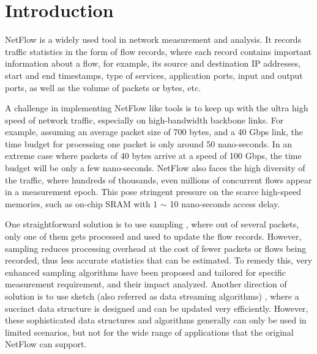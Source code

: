 \section{Introduction}
\label{section:introduction}
NetFlow\cite{claise_cisco_2004} is a widely used tool in network measurement and analysis.
It records traffic statistics in the form of flow records, where each record contains important 
information about a flow, for example, its source and destination IP addresses, 
start and end timestamps,  type of services, application ports, input and output ports, 
as well as the volume of packets or bytes, etc. 

A challenge in implementing NetFlow like tools is to keep up with the ultra high speed 
of network traffic, especially on high-bandwidth backbone links. For example, assuming an 
average packet size of 700 bytes, and a 40 Gbps link, the time budget for processing 
one packet is only around 50 nano-seconds\cite{zhang_more_2017}\cite{zhang_more_2015}\cite{wang_efficient_2019}.
 In an extreme case where packets of 40 bytes 
arrive at a speed of 100 Gbps, the time budget will be only a few nano-seconds. 
NetFlow also faces the high diversity of the traffic, where hundreds of thousands, 
even millions of concurrent flows appear in a measurement epoch. This pose stringent 
pressure on the scarce high-speed memories, such as on-chip SRAM with 1 $\sim$ 10 nano-seconds 
access delay\cite{li_flowradar:_2016}\cite{noauthor_access_nodate}.

One straightforward solution is to use sampling \cite{noauthor_sampled_nodate}, 
where out of several packets, only one of them gets processed and used to update the flow records.
However, sampling reduces processing overhead at the cost of fewer packets or flows being recorded, 
thus less accurate statistics that can be estimated. To remedy this, very enhanced sampling algorithms
\cite{hohn_inverting_2003}\cite{duffield_estimating_2005}\cite{tune_towards_2008}
have been proposed and tailored for specific measurement requirement, 
and their impact analyzed\cite{duffield2004}\cite{SamplingImpact}.
Another direction of solution is to use sketch (also referred as data streaming algorithms)
\cite{DataStreams2005}\cite{huang_sketchvisor:_2017}\cite{chen_counter_2017},
where a succinct data structure is designed and can be updated very efficiently. 
However, these sophisticated data structures and algorithms generally can only be used in limited scenarios, 
but not for the wide range of applications that the original NetFlow can support.

